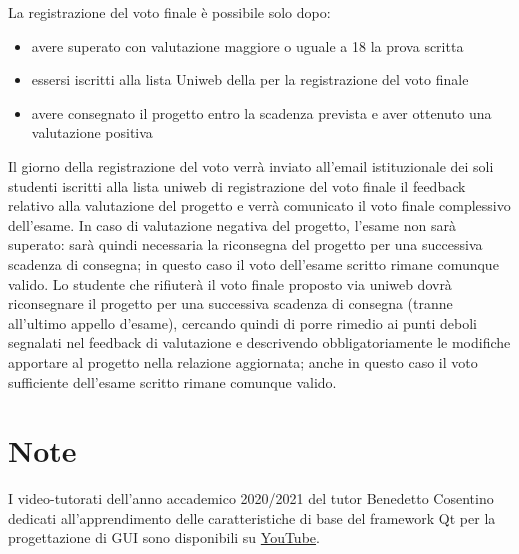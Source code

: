 \documentclass[10pt,a4paper,oneside]{article}
\begin{document}
La registrazione del voto finale è possibile solo dopo:
\begin{itemize}
 \item avere superato con valutazione maggiore o uguale a 18 la prova scritta
 \item essersi iscritti alla lista Uniweb della per la registrazione del voto finale
 \item avere consegnato il progetto entro la scadenza prevista e aver ottenuto una valutazione positiva
\end{itemize}
Il giorno della registrazione del voto verrà inviato all'email istituzionale dei soli studenti iscritti alla lista uniweb di registrazione del voto finale il feedback relativo alla valutazione del progetto e verrà comunicato il voto finale complessivo dell'esame. In caso di valutazione negativa del progetto, l'esame non sarà superato: sarà quindi necessaria la riconsegna del progetto per una successiva scadenza di consegna; in questo caso il voto dell'esame scritto rimane comunque valido. Lo studente che rifiuterà il voto finale proposto via uniweb dovrà riconsegnare il progetto per una successiva scadenza di consegna (tranne all'ultimo appello d'esame), cercando quindi di porre rimedio ai punti deboli segnalati nel feedback di valutazione e descrivendo obbligatoriamente le modifiche apportare al progetto nella relazione aggiornata; anche in questo caso il voto sufficiente dell'esame scritto rimane comunque valido.

\section{Note}
I video-tutorati dell'anno accademico 2020/2021 del tutor Benedetto Cosentino dedicati all'apprendimento delle caratteristiche di base del framework Qt per la progettazione di GUI sono disponibili su \href{https://www.youtube.com/playlist?list=PLH_Fd-836q-VcqWnnzsq3GOF2-0i_Az7p}{YouTube}.
\end{document}
